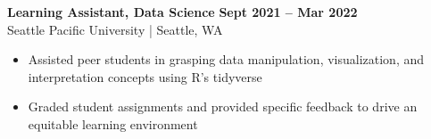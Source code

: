 \textbf{Learning Assistant, Data Science} \hfill \textbf{Sept 2021 -- Mar 2022} \\
    Seattle Pacific University | Seattle, WA
    \squish
    \begin{itemize}
        \item Assisted peer students in grasping data manipulation, visualization, and interpretation concepts using R's {tidyverse}
        \item Graded student assignments and provided specific feedback to drive an equitable learning environment
    \end{itemize}